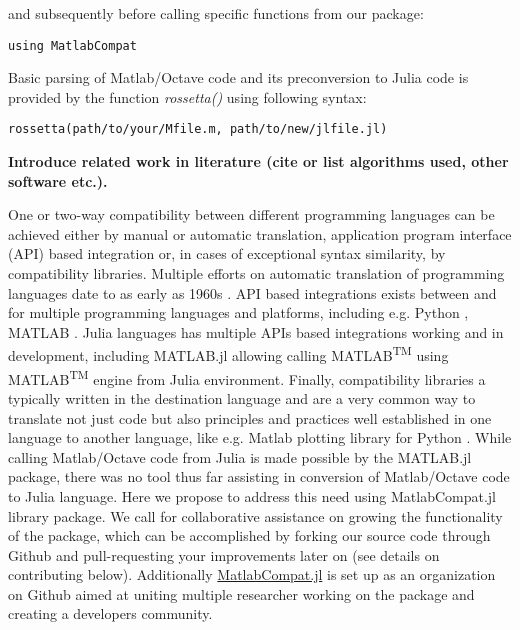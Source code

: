 and subsequently before calling specific functions from our package:

\verb|using MatlabCompat|

Basic parsing of Matlab/Octave code and its preconversion to Julia code is provided by the function \textit{rossetta()} using following syntax:

\verb|rossetta(path/to/your/Mfile.m, path/to/new/jlfile.jl)|

\textbf{Introduce related work in literature (cite or list algorithms used, other software etc.).}

One or two-way compatibility between different programming languages can be achieved either by manual or automatic translation, application program interface (API) based integration or, in cases of exceptional syntax similarity, by compatibility libraries. Multiple efforts on automatic translation of programming languages date to as early as 1960s \cite{Ledley_1962, irons1961syntax}. API based integrations exists between and for multiple programming languages and platforms, including e.g. Python \cite{autin2012upy}, MATLAB \cite{Bornstein_2008}. Julia languages has multiple APIs based integrations working and in development, including MATLAB.jl allowing calling MATLAB\textsuperscript{TM} using MATLAB\textsuperscript{TM} engine from Julia environment. Finally, compatibility libraries a typically written in the destination language and are a very common way to translate not just code but also principles and practices well established in one language to another language, like e.g. Matlab plotting library for Python \cite{Hunter_2007, barrett2005matplotlib}. While calling Matlab/Octave code from Julia is made possible by the MATLAB.jl package, there was no tool thus far assisting in conversion of Matlab/Octave 
code to Julia language. Here we propose to address this need using MatlabCompat.jl library package. We call for collaborative assistance on growing the functionality of the package, which can be accomplished by forking our source code through Github and pull-requesting your improvements later on (see details on contributing below). Additionally \href{http://matlabcompat.github.io/}{MatlabCompat.jl} is set up as an organization on Github aimed at uniting multiple researcher working on the package and creating a developers community.
    
    
    
    
    
    
    
    
    
    
    
    
    
    
    
    
  
  
  
  
  
  
  
  
  
  
  
  
  
  
  
  